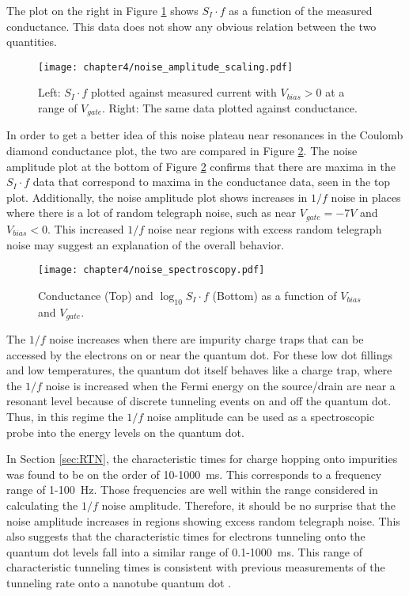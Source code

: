 The plot on the right in Figure \ref{fig:noise_current} shows $S_I \cdot f$ as a function of the measured conductance. This data does not show any obvious relation between the two quantities. 

\begin{figure}
    \centering
    \texttt{[image: chapter4/noise\_amplitude\_scaling.pdf]}
    \caption{Left: $S_I \cdot f$ plotted against measured current with $V_{bias}>0$ at a range of $V_{gate}$. Right: The same data plotted against conductance.}
    \label{fig:noise_current}
\end{figure}

In order to get a better idea of this noise plateau near resonances in the Coulomb diamond conductance plot, the two are compared in Figure \ref{fig:noise_spectroscopy}. The noise amplitude plot at the bottom of Figure \ref{fig:noise_spectroscopy} confirms that there are maxima in the $S_I \cdot f$ data that correspond to maxima in the conductance data, seen in the top plot. Additionally, the noise amplitude plot shows increases in $1/f$ noise in places where there is a lot of random telegraph noise, such as near $V_{gate} = -7V$ and $V_{bias}<0$. This increased $1/f$ noise near regions with excess random telegraph noise may suggest an explanation of the overall behavior. 

\begin{figure}
    \centering
    \texttt{[image: chapter4/noise\_spectroscopy.pdf]}
    \caption{Conductance (Top) and $\log_{10}{S_I \cdot f}$ (Bottom) as a function of $V_{bias}$ and $V_{gate}$.}
    \label{fig:noise_spectroscopy}
\end{figure}

The $1/f$ noise increases when there are impurity charge traps that can be accessed by the electrons on or near the quantum dot. For these low dot fillings and low temperatures, the quantum dot itself behaves like a charge trap, where the $1/f$ noise is increased when the Fermi energy on the source/drain are near a resonant level because of discrete tunneling events on and off the quantum dot. Thus, in this regime the $1/f$ noise amplitude can be used as a spectroscopic probe into the energy levels on the quantum dot.

In Section \ref{sec:RTN}, the characteristic times for charge hopping onto impurities was found to be on the order of 10-\SI{1000}{\milli\second}. This corresponds to a frequency range of 1-\SI{100}{\hertz}. Those frequencies are well within the range considered in calculating the $1/f$ noise amplitude. Therefore, it should be no surprise that the noise amplitude increases in regions showing excess random telegraph noise. This also suggests that the characteristic times for electrons tunneling onto the quantum dot levels fall into a similar range of 0.1-\SI{1000}{\milli\second}. This range of characteristic tunneling times is consistent with previous measurements of the tunneling rate onto a nanotube quantum dot \cite{Gotz2008}. 

